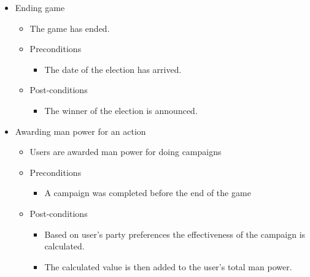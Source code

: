 \documentclass{article}
\begin{document}
	\begin{itemize}
   		\item  Ending game
			\begin{itemize}
				\item The game has ended.
				\item Preconditions
				\begin{itemize}
					\item The date of the election has arrived.
				\end{itemize}
				\item Post-conditions
				\begin{itemize}
					\item The winner of the election is announced.
				\end{itemize}
			\end{itemize}
	\end{itemize}	
	\begin{itemize}
		\item Awarding man power for an action
			\begin{itemize}
				\item Users are awarded man power for doing campaigns 
				\item Preconditions
				\begin{itemize}	
					\item A campaign was completed before the end of the game
				\end{itemize}
				\item Post-conditions
				\begin{itemize}	
					\item Based on user's party preferences the effectiveness of the campaign is calculated.
					\item The calculated value is then added to the user's total man power.
				\end{itemize}
			\end{itemize}
	\end{itemize}
		
\end{document}
